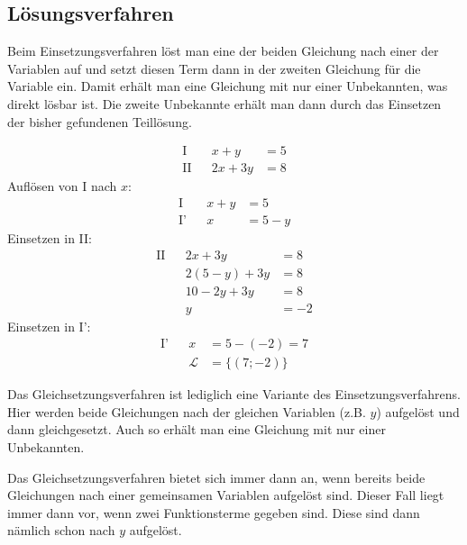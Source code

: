 \subsection*{Lösungsverfahren}

\begin{regel}[Einsetzungsverfahren]
 Beim Einsetzungsverfahren löst man eine der beiden Gleichung nach einer der Variablen auf und setzt diesen Term dann in der zweiten Gleichung für die Variable ein. Damit erhält man eine Gleichung mit nur einer Unbekannten, was direkt lösbar ist. Die zweite Unbekannte erhält man dann durch das Einsetzen der bisher gefundenen Teillösung.
\end{regel}

\begin{bsp}[Einsetzungsverfahren]
 \begin{align*}
  \text{I}&& x+y &= 5\\
  \text{II}&& 2x+3y &= 8
 \end{align*}
 Auflösen von I nach \(x\):
 \begin{align*}
  \text{I}&& x+y &= 5\\
  \text{I'}&& x &= 5-y
 \end{align*}
 Einsetzen in II:
 \begin{align*}
  \text{II}&& 2x+3y &= 8 \\
  && 2(5-y)+3y &= 8 \\
  && 10-2y+3y &= 8\\
  && y &= -2
 \end{align*}
 Einsetzen in I':
 \begin{align*}
  \text{I'}&& x &= 5-(-2) =7\\
  &&\mathcal{L} &= \lbrace (7;-2) \rbrace
 \end{align*}
\end{bsp}

\begin{regel}[Gleichsetzungsverfahren]
Das Gleichsetzungsverfahren ist lediglich eine Variante des Einsetzungsverfahrens. Hier werden beide Gleichungen nach der gleichen Variablen (z.B. \(y\)) aufgelöst und dann gleichgesetzt. Auch so erhält man eine Gleichung mit nur einer Unbekannten.  

Das Gleichsetzungsverfahren bietet sich immer dann an, wenn bereits beide Gleichungen nach einer gemeinsamen Variablen aufgelöst sind. Dieser Fall liegt immer dann vor, wenn zwei Funktionsterme gegeben sind. Diese sind dann nämlich schon nach \(y\) aufgelöst.
\end{regel}

